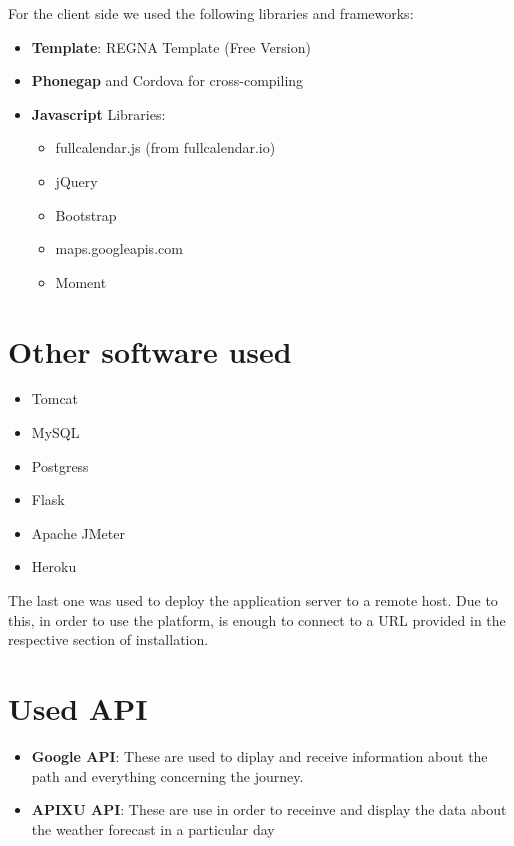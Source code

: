 \documentclass[numbers=noenddot, 12pt, a4paper, oneside]{scrbook}
\begin{document}
For the client side we used the following libraries and frameworks:
\begin{itemize}
	\item \textbf{Template}: REGNA Template (Free Version)
	\item \textbf{Phonegap} and Cordova for cross-compiling
	\item \textbf{Javascript} Libraries:
	\begin{itemize}
		\item fullcalendar.js (from fullcalendar.io)
		\item jQuery
		\item Bootstrap
		\item maps.googleapis.com
		\item Moment
	\end{itemize}	
\end{itemize}

\section*{Other software used}

\begin{itemize}
	\item Tomcat
	\item MySQL
	\item Postgress
	\item Flask
	\item Apache JMeter
	\item Heroku
\end{itemize}

The last one was used to deploy the application server to a remote host. Due to this, in order to use the platform, is enough to connect to a URL provided in the respective section of installation. 

\section*{Used API}

\begin{itemize}
	\item \textbf{Google API}: These are used to diplay and receive information about the path and everything concerning the journey.
	
	\item \textbf{APIXU API}: These are use in order to receinve and display the data about the weather forecast in a particular day
\end{itemize}
\end{document}

